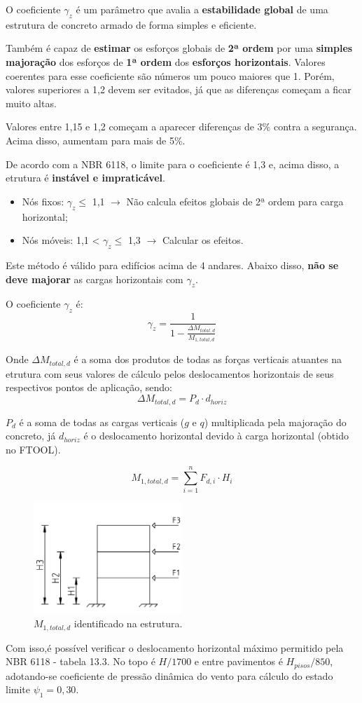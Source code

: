 O coeficiente $\gamma_z$ é um parâmetro que avalia a \textbf{estabilidade global} de uma estrutura de concreto armado de forma simples e eficiente.

Também é capaz de \textbf{estimar} os esforços globais de \textbf{2ª ordem} por uma \textbf{simples majoração} dos esforços de \textbf{1ª ordem} dos \textbf{esforços horizontais}. Valores coerentes para esse coeficiente são números um pouco maiores que 1. Porém, valores superiores a 1,2 devem ser evitados, já que as diferenças começam a ficar muito altas.

Valores entre 1,15 e 1,2 começam a aparecer diferenças de 3\% contra a segurança. Acima disso, aumentam para mais de 5\%.

De acordo com a NBR 6118, o limite para o coeficiente é 1,3 e, acima disso, a etrutura é \textbf{instável e impraticável}.

\begin{itemize}
	\item Nós fixos: $\gamma_z\leqslant$ 1,1 $\rightarrow$ Não calcula efeitos globais de 2ª ordem para carga horizontal;
	\item Nós móveis: 1,1 < $\gamma_z\leqslant$ 1,3 $\rightarrow$ Calcular os efeitos. 
\end{itemize}

Este método é válido para edifícios acima de 4 andares. Abaixo disso, \textbf{não se deve majorar} as cargas horizontais com $\gamma_z$.

O coeficiente $\gamma_z$ é: $$\gamma_z=\frac{1}{1-\frac{\Delta M_{total, d}}{M_{1, total, d}}}$$

Onde $\Delta M_{total, d}$ é a soma dos produtos de todas as forças verticais atuantes na etrutura com seus valores de cálculo pelos deslocamentos horizontais de seus respectivos pontos de aplicação, sendo: $$\Delta M_{total, d}=P_d\cdot d_{horiz}$$

$P_d$ é a soma de todas as cargas verticais ($g$ e $q$) multiplicada pela majoração do concreto, já $d_{horiz}$ é o deslocamento horizontal devido à carga horizontal (obtido no FTOOL).

$$M_{1, total, d}=\sum_{i=1}^{n} F_{d, i}\cdot H_i$$

\begin{figure}[H]
	\begin{center}
	\caption{$M_{1, total, d}$ identificado na estrutura.}
    	\includegraphics[width=0.5\textwidth]{Coeficiente-gamma-z/Imagens/M1-total-d.png}
	\end{center}
\end{figure}

Com isso,é possível verificar o deslocamento horizontal máximo permitido pela NBR 6118 - tabela 13.3. No topo é $H/1700$ e entre pavimentos é $H_{pisos}/850$, adotando-se coeficiente de pressão dinâmica do vento para cálculo do estado limite $\psi_1=0,30$.